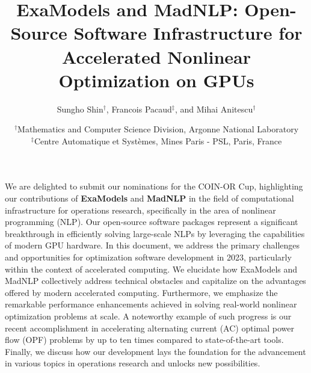 
\usepackage{wrapfig}
\title{ExaModels and MadNLP: Open-Source Software Infrastructure for Accelerated Nonlinear Optimization on GPUs}
\author{Sungho Shin$^\dag$, Francois Pacaud$^\ddag$, and Mihai Anitescu$^\dag$} 
\date{\small
  $^\dag$Mathematics and Computer Science Division, Argonne National Laboratory\\
  $^\ddag$Centre Automatique et Systèmes, Mines Paris - PSL, Paris, France
}

\maketitle

We are delighted to submit our nominations for the COIN-OR Cup,
highlighting our contributions of {\bf ExaModels} \cite{examodels} and
{\bf MadNLP} \cite{madnlp} in the field of computational
infrastructure for operations research, specifically in the area of
nonlinear programming (NLP). Our open-source software packages
represent a significant breakthrough in efficiently solving
large-scale NLPs by leveraging the capabilities of modern GPU
hardware.  In this document, we address the primary challenges and
opportunities for optimization software development in 2023,
particularly within the context of accelerated computing. We elucidate
how ExaModels and MadNLP collectively address technical obstacles and
capitalize on the advantages offered by modern accelerated
computing. Furthermore, we emphasize the remarkable performance
enhancements achieved in solving real-world nonlinear optimization
problems at scale. A noteworthy example of such progress is our recent
accomplishment in accelerating alternating current (AC) optimal power
flow (OPF) problems by up to ten times compared to state-of-the-art
tools. Finally, we discuss how our development lays the foundation for
the advancement in various topics in operations research and unlocks
new possibilities.


